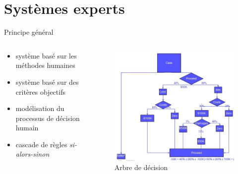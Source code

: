 \documentclass[9pt, aspectratio=169]{beamer}
\begin{document}
\section{Systèmes experts}

\begin{frame}{Principe général} %
\begin{columns}
    \begin{column}{0.58\textwidth}
    
    \begin{itemize}
    	\item système basé sur les méthodes humaines
    	\item système basé sur des critères objectifs 
    	\item modélisation du processus de décision humain
    	\item cascade de règles \emph{si-alors-sinon}
    \end{itemize}

    \end{column}
    \begin{column}{0.4\textwidth}
		\begin{figure}
			\includegraphics[width=\textwidth]{fig/decision_tree.jpg}
			\caption{Arbre de décision}
		\end{figure}
		
    \end{column}
\end{columns}
\end{frame}
\end{document}
